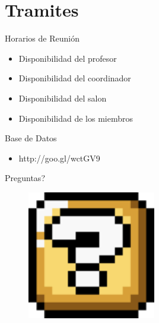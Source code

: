 \section{Tramites}

\begin{frame}{Horarios de Reunión}
	\begin{itemize}
		\item Disponibilidad del profesor
		\item Disponibilidad del coordinador
		\item Disponibilidad del salon
		\item Disponibilidad de los miembros
	\end{itemize}
\end{frame}

\begin{frame}{Base de Datos}
	\begin{itemize}
		\item http://goo.gl/wctGV9
	\end{itemize}
\end{frame}
 
 \begin{frame}{Preguntas?}
	
 	\begin{figure}[H]
		\centering
		\includegraphics[width=0.5\textwidth]{imgs/preguntas}
	\end{figure}
	
\end{frame}
